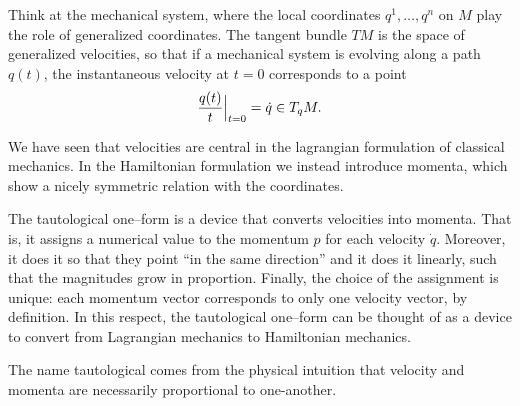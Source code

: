 \documentclass[english,fontsize=11pt,paper=a5,oneside]{scrbook}
\let\d\relax
\DeclareMathOperator{\d}{d}
\theoremstyle{definition}
\newenvironment{remark}
  {\pushQED{\qed}\renewcommand{\qedsymbol}{$\lozenge$}\remarkx}
  {\popQED\endremarkx}
\begin{document}
\begin{remark}
Think at the mechanical system, where the local coordinates $q^1, \ldots, q^n$ on $M$ play the role of generalized coordinates. The tangent bundle $TM$ is the space of generalized velocities, so that if a mechanical system is evolving along a path $q(t)$, the instantaneous velocity at $t = 0$ corresponds to a point
\begin{equation}
    \frac {\d q(t)}{\d t}\Big|_{t=0} = \dot {q} \in T_qM.
\end{equation}

We have seen that velocities are central in the lagrangian formulation of classical mechanics.
In the Hamiltonian formulation we instead introduce momenta, which show a nicely symmetric relation with the coordinates.

The tautological one--form is a device that converts velocities into momenta.
That is, it assigns a numerical value to the momentum $p$ for each velocity $\dot {q}$.
%
Moreover, it does it so that they point ``in the same direction'' and it does it linearly, such that the magnitudes grow in proportion.
%
Finally, the choice of the assignment is unique: each momentum vector corresponds to only one velocity vector, by definition.
In this respect, the tautological one--form can be thought of as a device to convert from Lagrangian mechanics to Hamiltonian mechanics. 

The name tautological comes from the physical intuition that velocity and momenta are necessarily proportional to one-another.
\end{remark}
\end{document}
